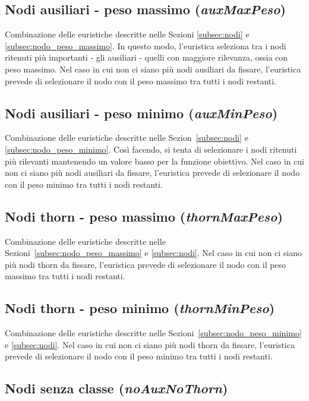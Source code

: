 \subsection{Nodi ausiliari - peso massimo (\textit{auxMaxPeso})}

Combinazione delle euristiche descritte nelle Sezioni \ref{subsec:nodi} e \ref{subsec:nodo_peso_massimo}. In questo modo, l'euristica seleziona tra i nodi ritenuti più importanti - gli ausiliari - quelli con maggiore rilevanza, ossia con peso massimo. Nel caso in cui non ci siano più nodi ausiliari da fissare, l'euristica prevede di selezionare il nodo con il peso massimo tra tutti i nodi restanti.

\subsection{Nodi ausiliari - peso minimo (\textit{auxMinPeso})}

Combinazione delle euristiche descritte nelle Sezion~\ref{subsec:nodi} e \ref{subsec:nodo_peso_minimo}. Così facendo, si tenta di selezionare i nodi ritenuti più rilevanti mantenendo un valore basso per la funzione obiettivo. Nel caso in cui non ci siano più nodi ausiliari da fissare, l'euristica prevede di selezionare il nodo con il peso minimo tra tutti i nodi restanti.

\subsection{Nodi thorn - peso massimo (\textit{thornMaxPeso})}

Combinazione delle euristiche descritte nelle Sezioni~\ref{subsec:nodo_peso_massimo} e \ref{subsec:nodi}. Nel caso in cui non ci siano più nodi thorn da fissare, l'euristica prevede di selezionare il nodo con il peso massimo tra tutti i nodi restanti.

\subsection{Nodi thorn - peso minimo (\textit{thornMinPeso})}

Combinazione delle euristiche descritte nelle Sezioni~\ref{subsec:nodo_peso_minimo} e \ref{subsec:nodi}. Nel caso in cui non ci siano più nodi thorn da fissare, l'euristica prevede di selezionare il nodo con il peso minimo tra tutti i nodi restanti.

\subsection{Nodi senza classe (\textit{noAuxNoThorn})}\label{subsec:nodi_senza_classe}

